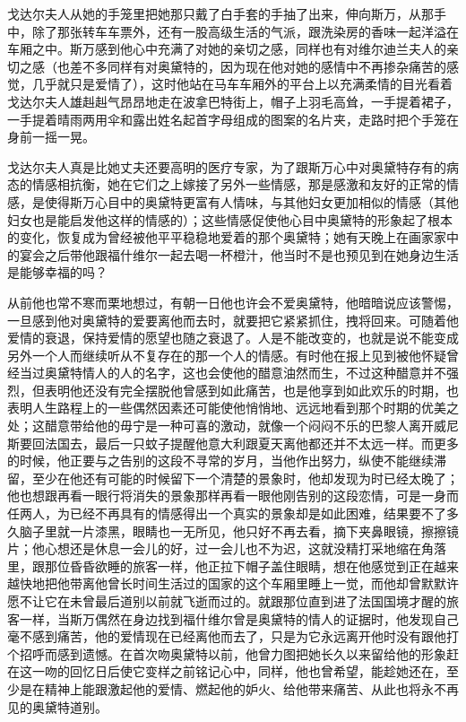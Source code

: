 \par 戈达尔夫人从她的手笼里把她那只戴了白手套的手抽了出来，伸向斯万，从那手中，除了那张转车车票外，还有一股高级生活的气派，跟洗染房的香味一起洋溢在车厢之中。斯万感到他心中充满了对她的亲切之感，同样也有对维尔迪兰夫人的亲切之感（也差不多同样有对奥黛特的，因为现在他对她的感情中不再掺杂痛苦的感觉，几乎就只是爱情了），这时他站在马车车厢外的平台上以充满柔情的目光看着戈达尔夫人雄赳赳气昂昂地走在波拿巴特街上，帽子上羽毛高耸，一手提着裙子，一手提着晴雨两用伞和露出姓名起首字母组成的图案的名片夹，走路时把个手笼在身前一摇一晃。
\par 戈达尔夫人真是比她丈夫还要高明的医疗专家，为了跟斯万心中对奥黛特存有的病态的情感相抗衡，她在它们之上嫁接了另外一些情感，那是感激和友好的正常的情感，是使得斯万心目中的奥黛特更富有人情味，与其他妇女更加相似的情感（其他妇女也是能启发他这样的情感的）；这些情感促使他心目中奥黛特的形象起了根本的变化，恢复成为曾经被他平平稳稳地爱着的那个奥黛特；她有天晚上在画家家中的宴会之后带他跟福什维尔一起去喝一杯橙汁，他当时不是也预见到在她身边生活是能够幸福的吗？
\par 从前他也常不寒而栗地想过，有朝一日他也许会不爱奥黛特，他暗暗说应该警惕，一旦感到他对奥黛特的爱要离他而去时，就要把它紧紧抓住，拽将回来。可随着他爱情的衰退，保持爱情的愿望也随之衰退了。人是不能改变的，也就是说不能变成另外一个人而继续听从不复存在的那一个人的情感。有时他在报上见到被他怀疑曾经当过奥黛特情人的人的名字，这也会使他的醋意油然而生，不过这种醋意并不强烈，但表明他还没有完全摆脱他曾感到如此痛苦，也是他享到如此欢乐的时期，也表明人生路程上的一些偶然因素还可能使他悄悄地、远远地看到那个时期的优美之处；这醋意带给他的毋宁是一种可喜的激动，就像一个闷闷不乐的巴黎人离开威尼斯要回法国去，最后一只蚊子提醒他意大利跟夏天离他都还并不太远一样。而更多的时候，他正要与之告别的这段不寻常的岁月，当他作出努力，纵使不能继续滞留，至少在他还有可能的时候留下一个清楚的景象时，他却发现为时已经太晚了；他也想跟再看一眼行将消失的景象那样再看一眼他刚告别的这段恋情，可是一身而任两人，为已经不再具有的情感得出一个真实的景象却是如此困难，结果要不了多久脑子里就一片漆黑，眼睛也一无所见，他只好不再去看，摘下夹鼻眼镜，擦擦镜片；他心想还是休息一会儿的好，过一会儿也不为迟，这就没精打采地缩在角落里，跟那位昏昏欲睡的旅客一样，他正拉下帽子盖住眼睛，想在他感觉到正在越来越快地把他带离他曾长时间生活过的国家的这个车厢里睡上一觉，而他却曾默默许愿不让它在未曾最后道别以前就飞逝而过的。就跟那位直到进了法国国境才醒的旅客一样，当斯万偶然在身边找到福什维尔曾是奥黛特的情人的证据时，他发现自己毫不感到痛苦，他的爱情现在已经离他而去了，只是为它永远离开他时没有跟他打个招呼而感到遗憾。在首次吻奥黛特以前，他曾力图把她长久以来留给他的形象赶在这一吻的回忆日后使它变样之前铭记心中，同样，他也曾希望，能趁她还在，至少是在精神上能跟激起他的爱情、燃起他的妒火、给他带来痛苦、从此也将永不再见的奥黛特道别。
